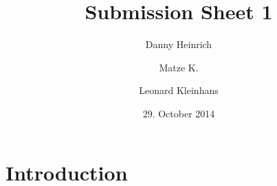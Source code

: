 \documentclass{scrartcl}
\title{Submission Sheet 1}
\author{Danny Heinrich \and Matze K. \and Leonard Kleinhans}
\date{29. October 2014}
\begin{document}
\maketitle

\section{Introduction}
\end{document}
